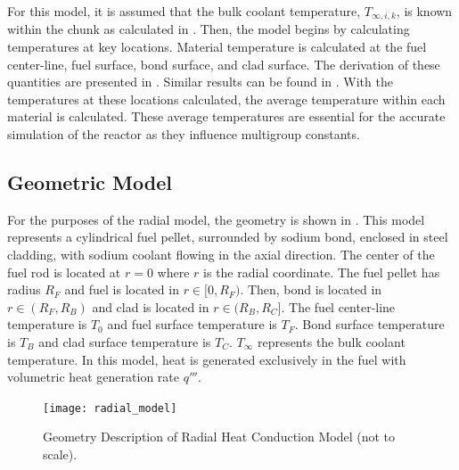   For this model, it is assumed
  that the bulk coolant temperature, $T_{\infty,i,k}$, is known within the chunk 
  as calculated in . Then, the model begins by 
  calculating temperatures at key locations. Material temperature is calculated
  at the fuel center-line, fuel surface, bond surface, and clad surface. The
  derivation of these quantities are presented in . 
  Similar results can be found in \cite{FastSpectrumReactors}. With the
  temperatures at these locations calculated, the average temperature within
  each material is calculated. These average temperatures are essential for the
  accurate simulation of the reactor as they influence multigroup constants.

  \subsection{Geometric Model}
    For the purposes of the radial model, the geometry is shown in
    . This model represents a cylindrical fuel pellet,
    surrounded by sodium bond, enclosed in steel cladding, with sodium coolant
    flowing in the axial direction. The center of the fuel rod is located at
    $r=0$ where $r$ is the radial coordinate. The fuel pellet has radius $R_F$
    and fuel is located in $r \in [0,R_F)$. Then, bond is located in 
    $r \in (R_F,R_B)$ and clad is located in $r \in (R_B,R_C]$. The fuel 
    center-line temperature is $T_0$ and fuel surface temperature is $T_F$. Bond
    surface temperature is $T_B$ and clad surface temperature is 
    $T_C$. $T_{\infty}$ represents the bulk coolant temperature. In this model,
    heat is generated exclusively in the fuel with volumetric heat generation 
    rate $q'''$. 

    \begin{figure}
      \centering
      \texttt{[image: radial\_model]}
      \caption{Geometry Description of Radial Heat Conduction Model (not to
        scale).}
      \label{fig:radial_model}
    \end{figure}

